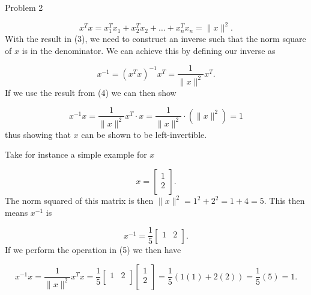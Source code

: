 \begin{problem}{Problem 2}
\begin{Highlight}
        \begin{equation}
            x^{T}x = x_{1}^{T}x_{1} + x_{2}^{T}x_{2} + \dots + x_{n}^{T}x_{n} = \|x\|^{2}.
        \end{equation}
        With the result in (3), we need to construct an inverse such that the norm square of $x$ is in the denominator. We can achieve this by defining our inverse as 

        \begin{equation}
            x^{-1} = (x^{T}x)^{-1}x^{T} = \frac{1}{\|x\|^{2}} x^{T}.
        \end{equation}
        If we use the result from (4) we can then show

        \begin{equation}
            x^{-1}x = \frac{1}{\|x\|^{2}} x^{T} \cdot x = \frac{1}{\|x\|^{2}} \cdot (\|x\|^{2}) = 1
        \end{equation}
        thus showing that $x$ can be shown to be left-invertible.

        Take for instance a simple example for $x$

        \begin{equation*}
            x = 
            \begin{bmatrix}
                1 \\
                2 \\
            \end{bmatrix}.
        \end{equation*}
        The norm squared of this matrix is then $\|x\|^{2} = 1^{2} + 2^{2} = 1 + 4 = 5$. This then means $x^{-1}$ is 

        \begin{equation*}
            x^{-1} = \frac{1}{5}
            \begin{bmatrix}
                1 & 2 \\
            \end{bmatrix}.
        \end{equation*}
        If we perform the operation in (5) we then have

        \begin{equation*}
            x^{-1}x = \frac{1}{\|x\|^{2}}x^{T}x = \frac{1}{5} 
            \begin{bmatrix}
                1 & 2 \\
            \end{bmatrix}
            \begin{bmatrix}
                1 \\
                2 \\
            \end{bmatrix}
            = \frac{1}{5}(1(1) + 2(2)) = \frac{1}{5}(5) = 1.
        \end{equation*}
    \end{Highlight}


\end{problem}

